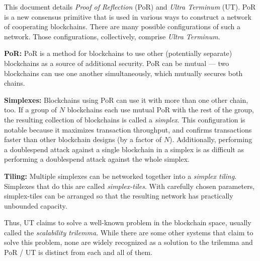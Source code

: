 This document details \emph{Proof of Reflection} (PoR) and \emph{Ultra Terminum} (UT).
PoR is a new consensus primitive that is used in various ways to construct a network of cooperating blockchains.
There are many possible configurations of such a network.
Those configurations, collectively, comprise \emph{Ultra Terminum}.

\textbf{PoR:}
PoR is a method for blockchains to use other (potentially separate) blockchains as a source of additional security.
PoR can be mutual --- two blockchains can use one another simultaneously, which mutually secures both chains.

\textbf{Simplexes:}
Blockchains using PoR can use it with more than one other chain, too.
If a group of $N$ blockchains each use mutual PoR with the rest of the group, the resulting collection of blockchains is called a \emph{simplex}.
This configuration is notable because it maximizes transaction throughput, and confirms transactions faster than other blockchain designs (by a factor of $N$).
Additionally, performing a doublespend attack against a single blockchain in a simplex is as difficult as performing a doublespend attack against the whole simplex.

\textbf{Tiling:}
Multiple simplexes can be networked together into a \emph{simplex tiling}.
Simplexes that do this are called \emph{simplex-tiles}.
With carefully chosen parameters, simplex-tiles can be arranged so that the resulting network has practically unbounded capacity.

Thus, UT claims to solve a well-known problem in the blockchain space, usually called the \emph{scalability trilemma}.
While there are some other systems that claim to solve this problem, none are widely recognized as a solution to the trilemma and PoR / UT is distinct from each and all of them.







